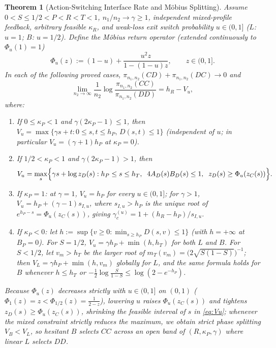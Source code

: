 \documentclass[11pt,reqno]{amsart}
\newtheorem{theorem}{Theorem}[section]
\theoremstyle{definition}
\theoremstyle{remark}
\begin{document}
\begin{theorem}[Action-Switching Interface Rate and M\"obius Splitting]\label{thm:interface}
Assume $0 < S \le 1/2 < P < R < T < 1$, $n_1/n_2 \to \gamma \ge 1$, independent mixed-profile feedback, arbitrary feasible $\kappa_R$, and weak-loss exit switch probability $u \in (0,1]$ ($L$: $u=1$; $B$: $u=1/2$). Define the M\"obius return operator (extended continuously to $\Phi_u(1) = 1$)
\begin{equation}\label{eq:mobius}
  \Phi_u(z) := (1 - u) + \frac{u^2 z}{1 - (1-u)z}, \qquad z \in (0,1].
\end{equation}
In each of the following proved cases, $\pi_{n_1,n_2}(CD)+\pi_{n_1,n_2}(DC)\to 0$ and
\[
  \lim_{n_2\to\infty}\frac{1}{n_2}\log\frac{\pi_{n_1,n_2}(CC)}{\pi_{n_1,n_2}(DD)} = h_R - V_u,
\]
where:
\begin{enumerate}
  \item If $0 \le \kappa_P < 1$ and $\gamma(2\kappa_P - 1) \le 1$, then $V_u = \max\{\gamma s + t : 0 \le s,t \le h_P,\, D(s,t)\le 1\}$ (independent of $u$; in particular $V_u = (\gamma+1)h_P$ at $\kappa_P=0$).
  \item If $1/2 < \kappa_P < 1$ and $\gamma(2\kappa_P - 1) > 1$, then
  \begin{equation}\label{eq:Vu}
    V_u = \max_{s}\Bigl\{\gamma s + \log z_D(s) : h_P \le s \le h_T,\;\; 4A_D(s)B_D(s) \le 1,\;\; z_D(s) \ge \Phi_u(z_C(s))\Bigr\}.
  \end{equation}
  \item If $\kappa_P = 1$: at $\gamma = 1$, $V_u = h_P$ for every $u \in (0,1]$; for $\gamma > 1$, $V_u = h_P + (\gamma - 1) s_{I,u}$, where $s_{I,u} > h_P$ is the unique root of $e^{h_P - s} = \Phi_u(z_C(s))$, giving $\gamma_c^{(u)} = 1 + (h_R - h_P)/s_{I,u}$.
  \item If $\kappa_P < 0$: let $h := \sup\{v \ge 0 : \min_{s \ge h_P} D(s,v) \le 1\}$ (with $h = +\infty$ at $B_P = 0$). For $S = 1/2$, $V_u = \gamma h_P + \min(h, h_T)$ for both $L$ and $B$. For $S < 1/2$, let $v_m > h_T$ be the larger root of $m_T(v_m) = \bigl(2\sqrt{S(1-S)}\bigr)^{-1}$; then $V_L = \gamma h_P + \min(h, v_m)$ globally for $L$, and the same formula holds for $B$ whenever $h \le h_T$ or $-\frac{1}{2}\log\frac{S}{1-S} \le \log(2 - e^{-h_P})$.
\end{enumerate}
Because $\Phi_u(z)$ decreases strictly with $u \in (0,1]$ on $(0,1)$ ($\Phi_1(z)=z < \Phi_{1/2}(z) = \frac{1}{2-z}$), lowering $u$ raises $\Phi_u(z_C(s))$ and tightens $z_D(s) \ge \Phi_u(z_C(s))$, shrinking the feasible interval of $s$ in \eqref{eq:Vu}; whenever the mixed constraint strictly reduces the maximum, we obtain strict phase splitting $V_B < V_L$, so hesitant $B$ selects $CC$ across an open band of $(R, \kappa_P, \gamma)$ where linear $L$ selects $DD$.
\end{theorem}
\end{document}
